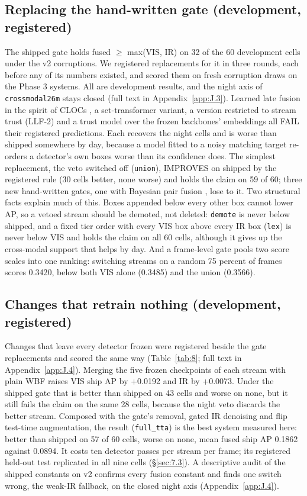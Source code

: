 \documentclass[10pt]{article}
\begin{document}
\subsection{Replacing the hand-written gate (development, registered)}\label{sec:6.9}
The shipped gate holds fused $\geq$ max(VIS, IR) on 32 of the 60 development cells under the v2 corruptions. We registered replacements for it in three rounds, each before any of its numbers existed, and scored them on fresh corruption draws on the Phase 3 systems. All are development results, and the night axis of \texttt{crossmodal26m} stays closed (full text in Appendix~\ref{app:J.3}). Learned late fusion in the spirit of CLOCs \citep{pang2020clocs}, a set-transformer variant, a version restricted to stream trust (LLF-2) and a trust model over the frozen backbones' embeddings all FAIL their registered predictions. Each recovers the night cells and is worse than shipped somewhere by day, because a model fitted to a noisy matching target re-orders a detector's own boxes worse than its confidence does. The simplest replacement, the veto switched off (\texttt{union}), IMPROVES on shipped by the registered rule (30 cells better, none worse) and holds the claim on 59 of 60; three new hand-written gates, one with Bayesian pair fusion \citep{chen2022multimodal}, lose to it. Two structural facts explain much of this. Boxes appended below every other box cannot lower AP, so a vetoed stream should be demoted, not deleted: \texttt{demote} is never below shipped, and a fixed tier order with every VIS box above every IR box (\texttt{lex}) is never below VIS and holds the claim on all 60 cells, although it gives up the cross-modal support that helps by day. And a frame-level gate pools two score scales into one ranking: switching streams on a random 75 percent of frames scores 0.3420, below both VIS alone (0.3485) and the union (0.3566).

\subsection{Changes that retrain nothing (development, registered)}\label{sec:6.10}
Changes that leave every detector frozen were registered beside the gate replacements and scored the same way (Table~\ref{tab:8}; full text in Appendix~\ref{app:J.4}). Merging the five frozen checkpoints of each stream with plain WBF raises VIS ship AP by +0.0192 and IR by +0.0073. Under the shipped gate that is better than shipped on 43 cells and worse on none, but it still fails the claim on the same 28 cells, because the night veto discards the better stream. Composed with the gate's removal, gated IR denoising and flip test-time augmentation, the result (\texttt{full\_\allowbreak{}tta}) is the best system measured here: better than shipped on 57 of 60 cells, worse on none, mean fused ship AP 0.1862 against 0.0894. It costs ten detector passes per stream per frame; its registered held-out test replicated in all nine cells (\S\ref{sec:7.3}). A descriptive audit of the shipped constants on v2 confirms every fusion constant and finds one switch wrong, the weak-IR fallback, on the closed night axis (Appendix~\ref{app:J.4}).
\end{document}
